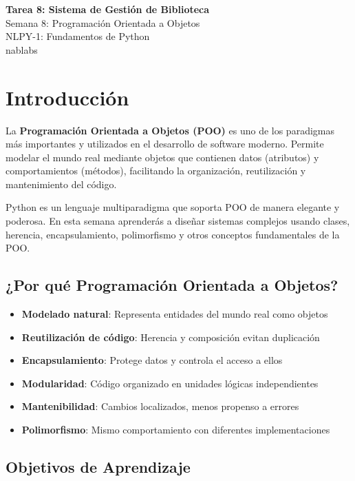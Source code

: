 \documentclass[11pt,letterpaper]{article}
\begin{document}
\begin{center}
    {\LARGE \textbf{Tarea 8: Sistema de Gestión de Biblioteca}}\\[0.3cm]
    {\Large Semana 8: Programación Orientada a Objetos}\\[0.2cm]
    {\large NLPY-1: Fundamentos de Python}\\[0.2cm]
    {\large nablabs}\\[0.5cm]
\end{center}

\section{Introducción}

La \textbf{Programación Orientada a Objetos (POO)} es uno de los paradigmas más importantes y utilizados en el desarrollo de software moderno. Permite modelar el mundo real mediante objetos que contienen datos (atributos) y comportamientos (métodos), facilitando la organización, reutilización y mantenimiento del código.

Python es un lenguaje multiparadigma que soporta POO de manera elegante y poderosa. En esta semana aprenderás a diseñar sistemas complejos usando clases, herencia, encapsulamiento, polimorfismo y otros conceptos fundamentales de la POO.

\subsection{¿Por qué Programación Orientada a Objetos?}

\begin{itemize}
    \item \textbf{Modelado natural}: Representa entidades del mundo real como objetos
    \item \textbf{Reutilización de código}: Herencia y composición evitan duplicación
    \item \textbf{Encapsulamiento}: Protege datos y controla el acceso a ellos
    \item \textbf{Modularidad}: Código organizado en unidades lógicas independientes
    \item \textbf{Mantenibilidad}: Cambios localizados, menos propenso a errores
    \item \textbf{Polimorfismo}: Mismo comportamiento con diferentes implementaciones
\end{itemize}

\subsection{Objetivos de Aprendizaje}
\end{document}
